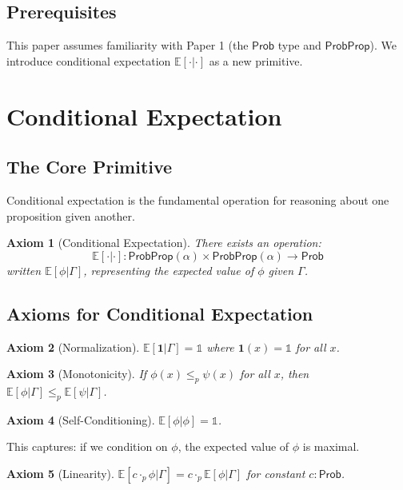 \documentclass[11pt,a4paper]{article}
\newtheorem{axiom}{Axiom}
\newcommand{\Prob}{\mathsf{Prob}}
\newcommand{\ProbProp}{\mathsf{ProbProp}}
\newcommand{\E}{\mathbb{E}}
\newcommand{\pone}{\mathbb{1}}
\newcommand{\ple}{\leq_p}
\newcommand{\pmul}{\cdot_p}
\begin{document}
\subsection{Prerequisites}

This paper assumes familiarity with Paper 1 (the $\Prob$ type and $\ProbProp$). We introduce conditional expectation $\E[\cdot|\cdot]$ as a new primitive.

\section{Conditional Expectation}

\subsection{The Core Primitive}

Conditional expectation is the fundamental operation for reasoning about one proposition given another.

\begin{axiom}[Conditional Expectation]
There exists an operation:
\[
\E[\cdot|\cdot] : \ProbProp(\alpha) \times \ProbProp(\alpha) \to \Prob
\]
written $\E[\phi|\Gamma]$, representing the expected value of $\phi$ given $\Gamma$.
\end{axiom}

\subsection{Axioms for Conditional Expectation}

\begin{axiom}[Normalization]
$\E[\mathbf{1}|\Gamma] = \pone$ where $\mathbf{1}(x) = \pone$ for all $x$.
\end{axiom}

\begin{axiom}[Monotonicity]
If $\phi(x) \ple \psi(x)$ for all $x$, then $\E[\phi|\Gamma] \ple \E[\psi|\Gamma]$.
\end{axiom}

\begin{axiom}[Self-Conditioning]
$\E[\phi|\phi] = \pone$.
\end{axiom}

This captures: if we condition on $\phi$, the expected value of $\phi$ is maximal.

\begin{axiom}[Linearity]
$\E[c \pmul \phi|\Gamma] = c \pmul \E[\phi|\Gamma]$ for constant $c : \Prob$.
\end{axiom}
\end{document}
